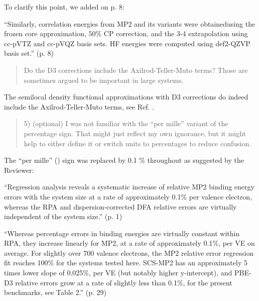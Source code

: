\documentclass[journal=jctcce,manuscript=article]{achemso}
\newcommand*{\rev}[1]{{\color{blue} #1}}
\newenvironment{reviewer}%
{\begin{quote}%
  \begin{changebar}\cbcolor{gray}\color{black}}%
  {\end{changebar}%
\end{quote}}
\begin{document}
To clarify this point, we added on p. 8: 

\rev{``Similarly, correlation energies from MP2 and its variants
    were obtainedusing the frozen core approximation, $50\%$ CP correction,
    and the 3-4 extrapolation using cc-pVTZ and cc-pVQZ basis
    sets\cite{Dunning89JChemPhys90p1007,doi:10.1063/1.464303}.
    HF energies were computed using def2-QZVP basis
    set\cite{Weigend05PhysChemChemPhys7p3297,Weigend03JChemPhys119p12753}.''}
(p. 8)
    
\begin{reviewer}
  Do the D3 corrections include the Axilrod-Teller-Muto terms?  Those are
  sometimes argued to be important in large systems.
\end{reviewer}

The semilocal density functional approximations with D3 corrections do
indeed include the Axilrod-Teller-Muto terms, see Ref.
.

\begin{reviewer}
5) (optional) I was not familiar with the ``per mille'' variant of the
percentage sign.  That might just reflect my own ignorance, but it might
help to either define it or switch units to percentages to reduce confusion.
\end{reviewer}

The ``per mille'' (\textperthousand) sign was replaced by 0.1
  \% throughout as suggested by the Reviewer:

``Regression analysis reveals a systematic increase of relative MP2 binding
  energy errors with the system size at a rate of approximately \rev{0.1$\%$}
  per valence electron, whereas the RPA and dispersion-corrected DFA relative
  errors are virtually independent of the system size.'' (p. 1)

``Whereas percentage errors in binding energies are virtually
  constant within RPA, they increase linearly for MP2, at a rate of approximately
  \rev{0.1$\%$}, per VE on average. For slightly over 700 valence electrons, the
  MP2 relative error regression fit reaches 100\% for the systems tested here.
  SCS-MP2 has an approximately 5 times lower slope of \rev{0.025$\%$}, per VE
  (but notably higher y-intercept), and PBE-D3 relative errors grow at a rate of
  slightly less than \rev{0.1$\%$}, for the present benchmarks, see Table 2.''
  (p. 29)
\end{document}
